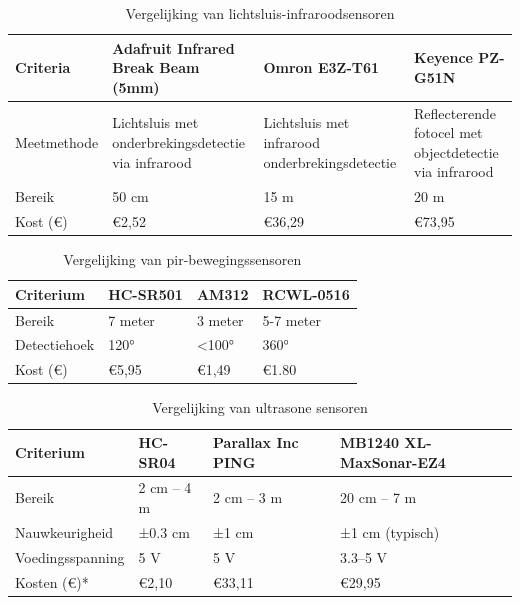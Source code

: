 \begin{table}[h!]
    \small
    \caption{Vergelijking van lichtsluis-infraroodsensoren \autocite{Industries2024, Omron2024, KEYENCE}}
    \begin{tabular}{|p{3cm}|p{4cm}|p{3.5cm}|p{3.5cm}|} %
        \hline
        \textbf{Criteria} & \textbf{Adafruit Infrared Break Beam (5mm)} & \textbf{Omron E3Z-T61} & \textbf{Keyence PZ-G51N} \\
        \hline
        Meetmethode & Lichtsluis met onderbrekingsdetectie via infrarood & Lichtsluis met infrarood onderbrekingsdetectie & Reflecterende fotocel met objectdetectie via infrarood \\
        \hline
        Bereik & 50 cm & 15 m & 20 m \\
        \hline
        Kost (€) & €2,52 & €36,29 & €73,95 \\
        \hline
    \end{tabular}
\end{table}

\begin{table}[h!]
    \small
    \caption{Vergelijking van \gls{pir}-bewegingssensoren \autocite{LastMinuteEngineersa, HobbyComponents, LastMinuteEngineers}}
    \label{tab:vergelijking-thermische-camera}
    \begin{tabular}{|p{4cm}|p{3.5cm}|p{3.5cm}|p{3cm}|}
        \hline
        \textbf{Criterium} & \textbf{HC-SR501} & \textbf{AM312} & \textbf{RCWL-0516} \\
        \hline
        Bereik & 7 meter & 3 meter & 5-7 meter \\
        \hline
        Detectiehoek & 120° & <100° & 360° \\
        \hline
        Kost (€) & €5,95 & €1,49 & €1.80 \\
        \hline
    \end{tabular}
\end{table}
\clearpage

\begin{table}[h!]
    \small
    \caption{Vergelijking van ultrasone sensoren \autocite{Elecfreaks2025, Inc.2025, Inc.2025a}}
    \label{tab:vergelijking-ultrasoonsensoren}
    \begin{tabular}{|p{3.5cm}|p{3cm}|p{3.5cm}|p{4cm}|}
        \hline
        \textbf{Criterium} & \textbf{HC-SR04} & \textbf{Parallax Inc PING} & \textbf{MB1240 XL-MaxSonar-EZ4} \\
    \hline
    Bereik & 2 cm – 4 m & 2 cm – 3 m & 20 cm – 7 m \\
    \hline
    Nauwkeurigheid & ±0.3 cm & ±1 cm & ±1 cm (typisch) \\
    \hline
    Voedingsspanning & 5 V & 5 V & 3.3–5 V \\
    \hline
    Kosten (€)* & €2,10 & €33,11 & €29,95 \\
    \hline
\end{tabular}
\end{table}


